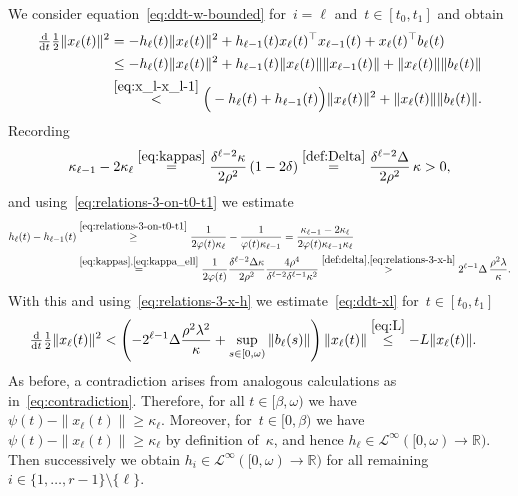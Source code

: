 \documentclass[ envcountsect, envcountsame]{svjour3}
\newcommand{\ddt}{\tfrac{\text{\normalfont d}}{\text{\normalfont d}t}}
\newcommand{\R}{\mathbb{R}}
\newcommand{\cL}{\mathcal{L}}
\newcommand{\vp}{\varphi}
\begin{document}
We consider equation~\eqref{eq:ddt-w-bounded} for~$i=\ell$ and~$t \in [t_0, t_1]$ and obtain
\begin{equation} \label{eq:ddt-xl}
\begin{aligned}
\ddt \tfrac{1}{2} \| x_{\ell}(t)\|^2 &= -h_\ell(t) \| x_{\ell}(t)\|^2 + h_{\ell-1}(t) x_{\ell}(t)^\top x_{\ell-1}(t) + x_{\ell}(t)^\top b_\ell(t) \\
& \le -h_\ell(t) \| x_{\ell}(t)\|^2 +  h_{\ell-1}(t) \|x_{\ell}(t)\| \|x_{\ell-1}(t)\| + \|x_{\ell}(t)\| \|b_\ell(t)\| \\
& \overset{\eqref{eq:x_l-x_l-1}}{<} \Big(- h_\ell(t) + h_{\ell-1}(t) \Big) \|x_\ell(t)\|^2    + \|x_{\ell}(t)\| \|b_\ell(t)\|.
\end{aligned}
\end{equation}
%
Recording
\begin{equation} \label{eq:kappa_ell}
\begin{aligned}
\kappa_{\ell-1} - 2 \kappa_{\ell} \overset{\eqref{eq:kappas}}{=} \frac{\delta^{\ell-2} \kappa }{2\rho^2} \left( 1- 2\delta \right)  
\overset{\eqref{def:Delta}}{=} \frac{\delta^{\ell-2} \Delta}{2 \rho^2} \, \kappa > 0 ,
\end{aligned}
\end{equation}
and using~\eqref{eq:relations-3-on-t0-t1} we estimate
\begin{equation*}
\begin{aligned}
h_{\ell}(t) - h_{\ell-1}(t)& 
\overset{\eqref{eq:relations-3-on-t0-t1}}{\ge} \frac{1}{2 \vp(t) \kappa_\ell} - \frac{1}{\vp(t) \kappa_{\ell-1}}  
= \frac{\kappa_{\ell-1} - 2 \kappa_\ell}{2 \vp(t) \kappa_{\ell-1} \kappa_\ell} \\
& \overset{\eqref{eq:kappas},\eqref{eq:kappa_ell}}{=} 
\frac{1}{2 \vp(t)}
\frac{\delta^{\ell-2} \Delta \kappa}{2 \rho^2} 
\frac{4 \rho^4}{\delta^{\ell-2} \delta^{\ell-1} \kappa^2} 
\overset{\eqref{def:delta},\eqref{eq:relations-3-x-h}}{>}  2^{\ell-1} \Delta \, \frac{\rho^2 \lambda}{\kappa}  .
%
\end{aligned}
\end{equation*}
With this and using~\eqref{eq:relations-3-x-h} we estimate~\eqref{eq:ddt-xl} for~$t \in [ t_0, t_1]$
\begin{equation*}
\begin{aligned}
\ddt \tfrac{1}{2} \| x_{\ell}(t)\|^2 &< \left( - 2^{\ell-1} \Delta \frac{\rho^2 \lambda^2}{ \kappa}  + \sup_{s \in [0,\omega)}  \|b_\ell(s)\| \right) \|x_\ell(t)\|
\overset{\eqref{eq:L}}{\le} -  L \|x_\ell(t)\|.
\end{aligned}
\end{equation*}
%
As before, a contradiction arises from analogous calculations as in~\eqref{eq:contradiction}.
Therefore, for all $t \in [\beta, \omega)$ we have $\psi(t) - \|x_\ell(t)\| \ge \kappa_\ell$.
Moreover, for~$t \in [0,\beta)$ we have ${\psi(t) - \|x_\ell(t)\| \ge \kappa_\ell}$ by definition of~$ \kappa$, and hence $h_\ell \in \cL^{\infty}([0,\omega) \to \R)$.
Then successively we obtain $h_i \in \cL^\infty([0,\omega) \to \R)$ for all remaining $i \in \{1,\ldots,r-1\}\setminus\{\ell\}$.
\end{document}
